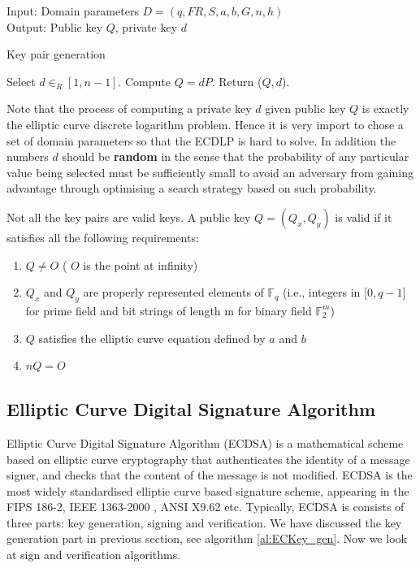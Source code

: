 \begin{algorithm}[H]
Input: Domain parameters $D=(q,FR,S,a,b,G,n,h)$ \\
Output: Public key $Q$, private key $d$ 
\caption{Key pair generation \cite{hankerson2006guide}}
 \label{al:ECKey_gen}
 \begin{algorithmic} [1]
	\STATE Select $d \in _R \left[ 1, n-1 \right] $.
	\STATE Compute $Q = dP$.
	\STATE Return ($Q,d$).
 \end{algorithmic}
\end{algorithm}
Note that the process of computing a private key $d$ given public key $Q$ is exactly the elliptic curve discrete logarithm problem. Hence it is very import to chose a set of domain parameters so that the ECDLP is hard to solve. In addition the numbers $d$ should be \textbf{random} in the sense that the probability of any particular value being selected must be sufficiently small to avoid an adversary from gaining advantage through optimising a search strategy based on such probability. 

Not all the key pairs are valid keys. A public key $Q=(Q_x,Q_y)$ is valid if it satisfies all the following requirements:
\begin{enumerate}
	\item $Q \neq O$ ( $O$ is the point at infinity)
	\item $Q_x$ and $Q_y$ are properly represented elements of $\mathbb{F}_q$ (i.e., integers in [$0,q-1$] for prime field and bit strings of length m for binary field $\mathbb{F}_2^m$)
	\item $Q$ satisfies the elliptic curve equation defined by $a$ and $b$
	\item $nQ=O$
\end{enumerate}
\subsection{Elliptic Curve Digital Signature Algorithm} \label{sec:ecdsa}
Elliptic Curve Digital Signature Algorithm (ECDSA) is a mathematical scheme based on elliptic curve cryptography that authenticates the identity of a message signer, and checks that the content of the message is not modified. ECDSA is the most widely standardised elliptic curve based signature scheme, appearing in the FIPS 186-2\cite{fips2000186}, IEEE 1363-2000 \cite{ieee2000ieee}, ANSI X9.62 \cite{ansi2005x9} etc. Typically, ECDSA is consists of three parts: key generation, signing and verification. We have discussed the key generation part in previous section, see algorithm \ref{al:ECKey_gen}. Now we look at sign and verification algorithms. 

